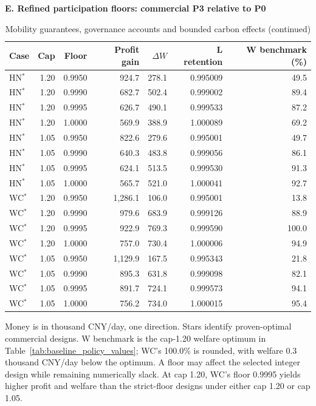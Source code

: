 \begin{table}[p]\ContinuedFloat\centering
\caption[]{Mobility guarantees, governance accounts and bounded carbon effects (continued)}
\begin{minipage}{.95\textwidth}\fontsize{8}{10}\selectfont{}\setlength{\tabcolsep}{3pt}\renewcommand{\arraystretch}{1.10}
\par\noindent\textbf{E. Refined participation floors: commercial P3 relative to P0}\par\smallskip
\begin{tabular*}{\linewidth}{@{\extracolsep{\fill}}lrrrrrr@{}}\toprule
Case & Cap & Floor & Profit gain & $\Delta W$ & L retention & W benchmark (\%) \\
\midrule
HN$^{*}$ & 1.20 & 0.9950 & 924.7 & 278.1 & 0.995009 & 49.5 \\
HN$^{*}$ & 1.20 & 0.9990 & 682.7 & 502.4 & 0.999002 & 89.4 \\
HN$^{*}$ & 1.20 & 0.9995 & 626.7 & 490.1 & 0.999533 & 87.2 \\
HN$^{*}$ & 1.20 & 1.0000 & 569.9 & 388.9 & 1.000089 & 69.2 \\
HN$^{*}$ & 1.05 & 0.9950 & 822.6 & 279.6 & 0.995001 & 49.7 \\
HN$^{*}$ & 1.05 & 0.9990 & 640.3 & 483.8 & 0.999056 & 86.1 \\
HN$^{*}$ & 1.05 & 0.9995 & 624.1 & 513.5 & 0.999530 & 91.3 \\
HN$^{*}$ & 1.05 & 1.0000 & 565.7 & 521.0 & 1.000041 & 92.7 \\
\addlinespace
WC$^{*}$ & 1.20 & 0.9950 & 1,286.1 & 106.0 & 0.995001 & 13.8 \\
WC$^{*}$ & 1.20 & 0.9990 & 979.6 & 683.9 & 0.999126 & 88.9 \\
WC$^{*}$ & 1.20 & 0.9995 & 922.9 & 769.3 & 0.999590 & 100.0 \\
WC$^{*}$ & 1.20 & 1.0000 & 757.0 & 730.4 & 1.000006 & 94.9 \\
WC$^{*}$ & 1.05 & 0.9950 & 1,129.9 & 167.5 & 0.995343 & 21.8 \\
WC$^{*}$ & 1.05 & 0.9990 & 895.3 & 631.8 & 0.999098 & 82.1 \\
WC$^{*}$ & 1.05 & 0.9995 & 891.7 & 724.1 & 0.999573 & 94.1 \\
WC$^{*}$ & 1.05 & 1.0000 & 756.2 & 734.0 & 1.000015 & 95.4 \\
\bottomrule\end{tabular*}\par\medskip
\par\noindent Money is in thousand CNY/day, one direction. Stars identify proven-optimal commercial designs. W benchmark is the cap-1.20 welfare optimum in Table~\ref{tab:baseline_policy_values}; WC's 100.0\% is rounded, with welfare 0.3 thousand CNY/day below the optimum. A floor may affect the selected integer design while remaining numerically slack. At cap 1.20, WC's floor 0.9995 yields higher profit and welfare than the strict-floor designs under either cap 1.20 or cap 1.05.
\end{minipage}\end{table}

